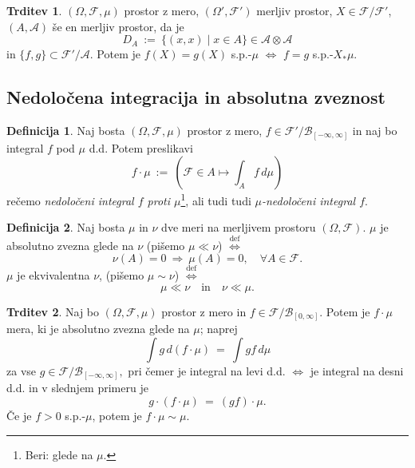 \documentclass[11pt]{article}
\newcommand{\A}{\mathcal{A}}
\newcommand{\F}{\mathcal{F}}
\newcommand{\B}{\mathscr{B}}
\newcommand{\diff}{\overset{\text{def}}{\iff}}
\newcommand{\set}[1]{\{#1\}}
\newcommand{\oklepaj}[1]{\left(#1\right)}
\newcommand{\1}{\mathbbm{1}}
\newcommand{\rr}{[-\infty,\infty]}
\theoremstyle{definition}
\newtheorem{definicija}{Definicija}[section]
\theoremstyle{definition}
\newtheorem{trditev}{Trditev}[section]
\theoremstyle{definition}
\theoremstyle{definition}
\begin{document}
\begin{trditev}

$(\Omega,\F,\mu)$ prostor z mero, $(\Omega',\F')$ merljiv prostor, $X \in \F/\F'$, $(A,\A)$ še en merljiv prostor, da je
$$D_A ~:=~ \set{(x,x) \mid x \in A} \in \A\otimes\A$$
in $\set{f,g} \subset \F'/\A$. Potem je $f(X) = g(X)$ s.p.-$\mu$ $\iff$ $f=g$ s.p.-$X_*\mu$.

\end{trditev}
\vspace{0.5cm}


\subsection{Nedoločena integracija in absolutna zveznost}
\vspace{0.5cm}

\begin{definicija}

Naj bosta $(\Omega,\F,\mu)$ prostor z mero, $f \in \F'/\B_{\rr}$ in naj bo integral $f$ pod $\mu$ d.d. Potem preslikavi
$$f \cdot \mu ~:=~ \oklepaj{\F \in A \mapsto \int_A f\,d\mu}$$
rečemo \textit{nedoločeni integral $f$ proti $\mu$}\footnote{Beri: glede na $\mu$.}, ali tudi tudi \textit{$\mu$-nedoločeni integral $f$}.

\end{definicija}
\vspace{0.5cm}

\begin{definicija}

Naj bosta $\mu$ in $\nu$ dve meri na merljivem prostoru $(\Omega,\F)$. $\mu$ je absolutno zvezna glede na $\nu$ (pišemo $\mu \ll \nu$) $\diff$
$$\nu(A) = 0 ~\Rightarrow~ \mu(A) = 0, \quad \forall A \in \F.$$
$\mu$ je ekvivalentna $\nu$, (pišemo $\mu\sim\nu$) $\diff$
$$\mu \ll \nu \quad \text{in} \quad \nu \ll \mu.$$

\end{definicija}
\vspace{0.5cm}

\begin{trditev}

Naj bo $(\Omega,\F,\mu)$ prostor z mero in $f \in \F/\B_{[0,\infty]}$. Potem je $f \cdot \mu$ mera, ki je absolutno zvezna glede na $\mu$; naprej
$$\int g \,d(f\cdot\mu) ~=~ \int gf\,d\mu$$
za vse $g \in \F/\B_{\rr},$ pri čemer je integral na levi d.d. $\iff$ je integral na desni d.d. in v slednjem primeru je 
$$g \cdot (f \cdot \mu) ~=~ (gf) \cdot \mu.$$
Če je $f>0$ s.p.-$\mu$, potem je $f\cdot\mu \sim \mu$.

\end{trditev}
\vspace{0.5cm}
\end{document}
